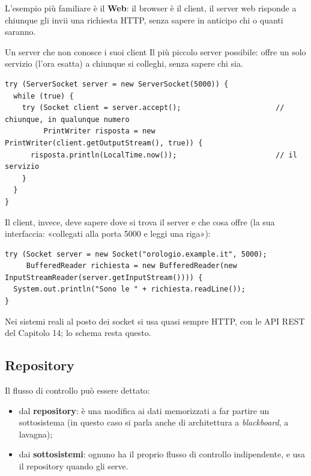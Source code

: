 L'esempio più familiare è il \textbf{Web}: il browser è il client, il server web risponde a chiunque gli invii una
richiesta HTTP, senza sapere in anticipo chi o quanti saranno.

\begin{esempio}{Un server che non conosce i suoi client}
Il più piccolo server possibile: offre un solo servizio (l'ora esatta) a chiunque si colleghi, senza sapere chi sia.
\begin{lstlisting}[style=java, name=ServerOrario.java]
try (ServerSocket server = new ServerSocket(5000)) {
  while (true) {
    try (Socket client = server.accept();                      // chiunque, in qualunque numero
         PrintWriter risposta = new PrintWriter(client.getOutputStream(), true)) {
      risposta.println(LocalTime.now());                       // il servizio
    }
  }
}
\end{lstlisting}
Il client, invece, deve sapere dove si trova il server e che cosa offre (la sua interfaccia: «collegati alla porta 5000
e leggi una riga»):
\begin{lstlisting}[style=java, name=ClientOrario.java]
try (Socket server = new Socket("orologio.example.it", 5000);
     BufferedReader richiesta = new BufferedReader(new InputStreamReader(server.getInputStream()))) {
  System.out.println("Sono le " + richiesta.readLine());
}
\end{lstlisting}
Nei sistemi reali al posto dei socket si usa quasi sempre HTTP, con le API REST del Capitolo 14; lo schema resta questo.
\end{esempio}

\subsection{Repository}


Il flusso di controllo può essere dettato:
\begin{itemize}
  \item dal \textbf{repository}: è una modifica ai dati memorizzati a far partire un sottosistema (in questo caso si parla
        anche di architettura a \textit{blackboard}, a lavagna);
  \item dai \textbf{sottosistemi}: ognuno ha il proprio flusso di controllo indipendente, e usa il repository quando gli serve.
\end{itemize}

